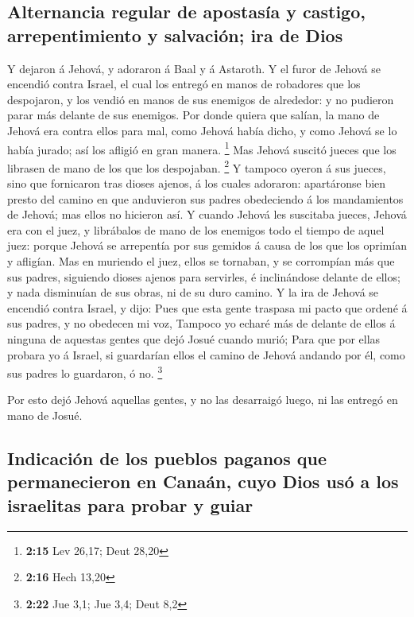 \hypertarget{alternancia-regular-de-apostasuxeda-y-castigo-arrepentimiento-y-salvaciuxf3n-ira-de-dios}{%
\subsection{Alternancia regular de apostasía y castigo, arrepentimiento
y salvación; ira de
Dios}\label{alternancia-regular-de-apostasuxeda-y-castigo-arrepentimiento-y-salvaciuxf3n-ira-de-dios}}

 Y dejaron á Jehová, y adoraron á Baal y á Astaroth.
 Y el furor de Jehová se encendió contra Israel, el cual
los entregó en manos de robadores que los despojaron, y los vendió en
manos de sus enemigos de alrededor: y no pudieron parar más delante de
sus enemigos.  Por donde quiera que salían, la mano de
Jehová era contra ellos para mal, como Jehová había dicho, y como Jehová
se lo había jurado; así los afligió en gran manera. \footnote{\textbf{2:15}
  Lev 26,17; Deut 28,20}  Mas Jehová suscitó jueces que los
librasen de mano de los que los despojaban. \footnote{\textbf{2:16} Hech
  13,20}  Y tampoco oyeron á sus jueces, sino que
fornicaron tras dioses ajenos, á los cuales adoraron: apartáronse bien
presto del camino en que anduvieron sus padres obedeciendo á los
mandamientos de Jehová; mas ellos no hicieron así.  Y
cuando Jehová les suscitaba jueces, Jehová era con el juez, y librábalos
de mano de los enemigos todo el tiempo de aquel juez: porque Jehová se
arrepentía por sus gemidos á causa de los que los oprimían y afligían.
 Mas en muriendo el juez, ellos se tornaban, y se
corrompían más que sus padres, siguiendo dioses ajenos para servirles, é
inclinándose delante de ellos; y nada disminuían de sus obras, ni de su
duro camino.  Y la ira de Jehová se encendió contra Israel,
y dijo: Pues que esta gente traspasa mi pacto que ordené á sus padres, y
no obedecen mi voz,  Tampoco yo echaré más de delante de
ellos á ninguna de aquestas gentes que dejó Josué cuando murió;
 Para que por ellas probara yo á Israel, si guardarían
ellos el camino de Jehová andando por él, como sus padres lo guardaron,
ó no. \footnote{\textbf{2:22} Jue 3,1; Jue 3,4; Deut 8,2}

 Por esto dejó Jehová aquellas gentes, y no las desarraigó
luego, ni las entregó en mano de Josué.

\hypertarget{indicaciuxf3n-de-los-pueblos-paganos-que-permanecieron-en-canauxe1n-cuyo-dios-usuxf3-a-los-israelitas-para-probar-y-guiar}{%
\subsection{Indicación de los pueblos paganos que permanecieron en
Canaán, cuyo Dios usó a los israelitas para probar y
guiar}\label{indicaciuxf3n-de-los-pueblos-paganos-que-permanecieron-en-canauxe1n-cuyo-dios-usuxf3-a-los-israelitas-para-probar-y-guiar}}

